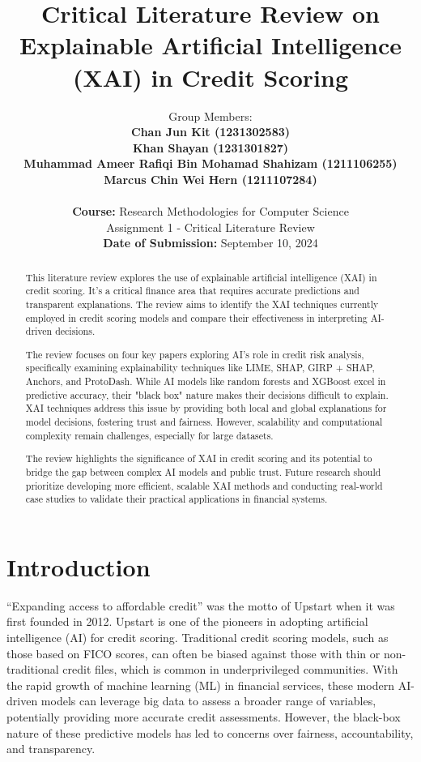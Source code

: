\documentclass[12pt,a4paper]{article}
\title{Critical Literature Review on Explainable Artificial Intelligence (XAI) in Credit Scoring}
\author{Group Members: \\
\textbf{Chan Jun Kit (1231302583)} \\
\textbf{Khan Shayan (1231301827)} \\
\textbf{Muhammad Ameer Rafiqi Bin Mohamad Shahizam (1211106255)} \\
\textbf{Marcus Chin Wei Hern (1211107284)} \\
\\
\textbf{Course:} Research Methodologies for Computer Science \\
Assignment 1 - Critical Literature Review \\
\textbf{Date of Submission:} September 10, 2024}
\date{}
\begin{document}
\maketitle
\newpage

\begin{abstract}
    \setlength{\parindent}{0pt}
    \setlength{\parskip}{1em}
    \noindent
    This literature review explores the use of explainable artificial intelligence (XAI) in credit scoring. It's a critical finance area that requires accurate predictions and transparent explanations. The review aims to identify the XAI techniques currently employed in credit scoring models and compare their effectiveness in interpreting AI-driven decisions.

    The review focuses on four key papers exploring AI's role in credit risk analysis, specifically examining explainability techniques like LIME, SHAP, GIRP + SHAP, Anchors, and ProtoDash. While AI models like random forests and XGBoost excel in predictive accuracy, their "black box" nature makes their decisions difficult to explain. XAI techniques address this issue by providing both local and global explanations for model decisions, fostering trust and fairness. However, scalability and computational complexity remain challenges, especially for large datasets.
    
    The review highlights the significance of XAI in credit scoring and its potential to bridge the gap between complex AI models and public trust. Future research should prioritize developing more efficient, scalable XAI methods and conducting real-world case studies to validate their practical applications in financial systems.

\end{abstract}
\newpage


\tableofcontents
\newpage

\section{Introduction}
\vspace{-1em}
“Expanding access to affordable credit” was the motto of Upstart when it was first founded in 2012. Upstart is one of the pioneers in adopting artificial intelligence (AI) for credit scoring. Traditional credit scoring models, such as those based on FICO scores, can often be biased against those with thin or non-traditional credit files, which is common in underprivileged communities. With the rapid growth of machine learning (ML) in financial services, these modern AI-driven models can leverage big data to assess a broader range of variables, potentially providing more accurate credit assessments. However, the black-box nature of these predictive models has led to concerns over fairness, accountability, and transparency. 
\end{document}

